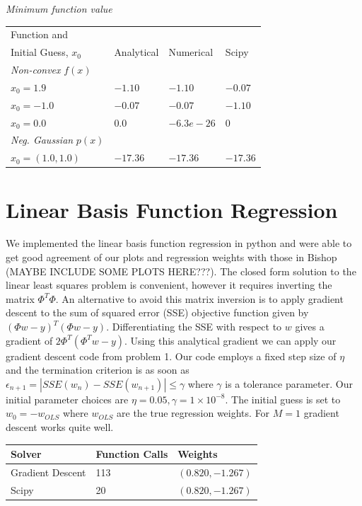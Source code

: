 \documentclass{article}
\begin{document}
\textit{Minimum function value}

\begin{tabular}{|l|l|l|l|}
\hline
Function and & & &\\ Initial Guess, $x_0$ & Analytical & Numerical & Scipy \\ \hline
\textit{Non-convex} $f(x)$ & & &\\ \hline
$x_0 = 1.9$ & $-1.10$ & $-1.10$ & $-0.07$\\\hline
$x_0 = -1.0$ & $-0.07$ & $-0.07$ & $-1.10$ \\ \hline
$x_0 = 0.0$ & $0.0$ & $-6.3e-26$ & $0$\\ \hline
\textit{Neg. Gaussian} $p(x)$ & & & \\ \hline
$x_0 = (1.0,1.0)$ & $-17.36$ & $-17.36$ & $-17.36$ \\ \hline
\end{tabular}



\section{Linear Basis Function Regression}
We implemented the linear basis function regression in python and were able to get good agreement of our plots and regression weights with those in Bishop (MAYBE INCLUDE SOME PLOTS HERE???). The closed form solution to the linear least squares problem is convenient, however it requires inverting the matrix $\Phi^T \Phi$. An alternative to avoid this matrix inversion is to apply gradient descent to the sum of squared error (SSE) objective function given by $(\Phi w - y)^T(\Phi w - y)$. Differentiating the SSE with respect to $w$ gives a gradient of $2\Phi^T(\Phi^T w - y)$. Using this analytical gradient we can apply our gradient descent code from problem 1. Our code employs a fixed step size of $\eta$ and the termination criterion is as soon as $\epsilon_{n+1} = |SSE(w_n) - SSE(w_{n+1})| \leq \gamma $ where $\gamma$ is a tolerance parameter. Our initial parameter choices are $\eta = 0.05, \gamma = 1 \times 10^{-8}$. The initial guess is set to $w_0 = -w_{OLS}$ where $w_{OLS}$ are the true regression weights. For $M = 1$ gradient descent works quite well.

\begin{tabular}{|l|l|l|}
\hline
Solver & Function Calls & Weights \\ \hline
Gradient Descent & 113 & $(0.820, -1.267)$ \\ \hline
Scipy & 20 & $(0.820, -1.267)$ \\ \hline
\end{tabular}
%
\end{document}
